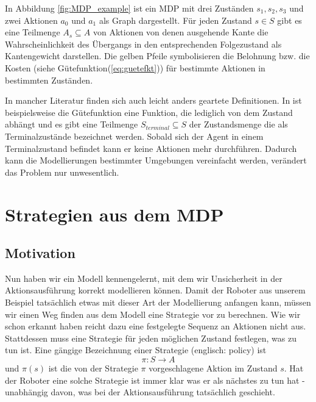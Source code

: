 \documentclass[a4paper]{IEEEtran}
\begin{document}
In Abbildung \ref{fig:MDP_example} ist ein MDP mit drei Zuständen $s_1, s_2, s_3$ und zwei Aktionen $a_0$ und $a_1$ als Graph dargestellt. Für jeden Zustand $s \in S$ gibt es eine Teilmenge $A_s \subseteq A$ von Aktionen von denen ausgehende Kante die Wahrscheinlichkeit des Übergangs in den entsprechenden Folgezustand als Kantengewicht darstellen. Die gelben Pfeile symbolisieren die Belohnung bzw. die Kosten (siehe Gütefunktion(\ref{eq:guetefkt})) für bestimmte Aktionen in bestimmten Zuständen.

In mancher Literatur finden sich auch leicht anders geartete Definitionen. In \cite{russell1995artificial} ist beispielsweise die Gütefunktion eine Funktion, die lediglich von dem Zustand abhängt und es gibt eine Teilmenge $S_{terminal} \subseteq S$ der Zustandsmenge die als Terminalzustände bezeichnet werden. Sobald sich der Agent in einem Terminalzustand befindet kann er keine Aktionen mehr durchführen. Dadurch kann die Modellierungen bestimmter Umgebungen vereinfacht werden, verändert das Problem nur unwesentlich.


\section{Strategien aus dem MDP}
\subsection{Motivation}
Nun haben wir ein Modell kennengelernt, mit dem wir Unsicherheit in der Aktionsausführung korrekt modellieren können. Damit der Roboter aus unserem Beispiel tatsächlich etwas mit dieser Art der Modellierung anfangen kann, müssen wir einen Weg finden aus dem Modell eine Strategie vor zu berechnen. Wie wir schon erkannt haben reicht dazu eine festgelegte Sequenz an Aktionen nicht aus. Stattdessen muss eine Strategie für jeden möglichen Zustand festlegen, was zu tun ist. Eine gängige Bezeichnung einer Strategie (englisch: policy) ist
\begin{equation}
	\pi:S \rightarrow A
\end{equation}
und $\pi(s)$ ist die von der Strategie $\pi$ vorgeschlagene Aktion im Zustand $s$. Hat der Roboter eine solche Strategie ist immer klar was er als nächstes zu tun hat - unabhängig davon, was bei der Aktionsausführung tatsächlich geschieht.
\end{document}
